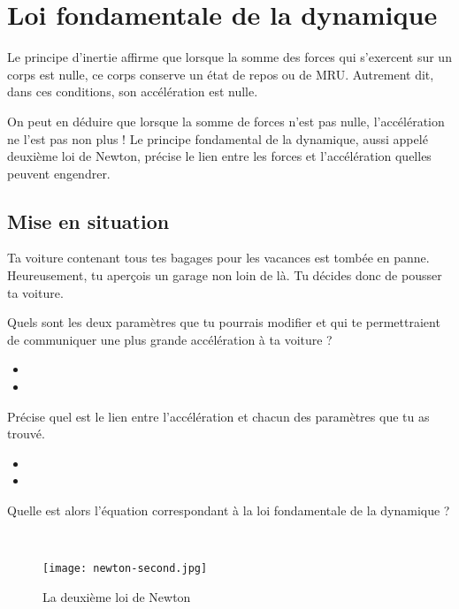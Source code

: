 \chapter{Loi fondamentale de la dynamique}
Le principe d'inertie affirme que lorsque la somme des forces qui s'exercent sur un corps est nulle, ce corps conserve un état de repos ou de MRU.
Autrement dit, dans ces conditions, son accélération est nulle.

On peut en déduire que lorsque la somme de forces n'est pas nulle, l'accélération ne l'est pas non plus !
Le principe fondamental de la dynamique, aussi appelé deuxième loi de Newton, précise le lien entre les forces et l'accélération quelles peuvent engendrer.

\section{Mise en situation}
Ta voiture contenant tous tes bagages pour les vacances est tombée en panne. Heureusement, tu aperçois un garage non loin de là. Tu décides donc de pousser ta voiture.

Quels sont les deux paramètres que tu pourrais modifier et qui te permettraient de communiquer une plus grande accélération à ta voiture ?
\begin{itemize}[\textbullet]
    \item \dotfill
    \item \dotfill
\end{itemize}

Précise quel est le lien entre l'accélération et chacun des paramètres que tu as trouvé.
\begin{itemize}[\textbullet]
    \item \dotfill
    \item \dotfill
\end{itemize}

Quelle est alors l'équation correspondant à la loi fondamentale de la dynamique ?
\begin{tcolorbox}
    \hfill \\

\end{tcolorbox}

\begin{figure}[h!]
    \centering
    \texttt{[image: newton-second.jpg]}
    \caption{La deuxième loi de Newton}
    \label{newton_second}
\end{figure}

\newpage

